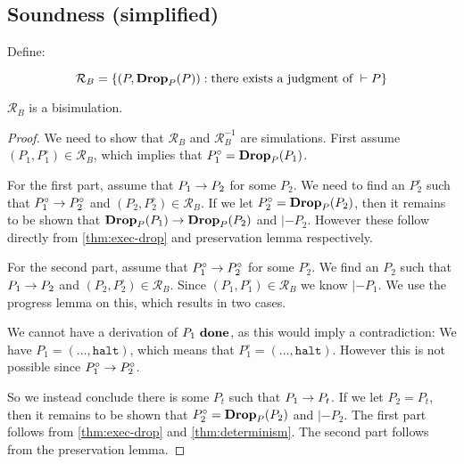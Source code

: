 \subsection{Soundness (simplified)}
\begin{lemma}[Bisimulation]
  \label{thm:bisimulation}
  Define:

  $$\mathcal{R}_B =\{(P, \mathbf{Drop}_{{P}}({P})) : \text{there exists a judgment of } |-
  P\}$$

  $\mathcal{R}_B$ is a bisimulation.
\end{lemma}
\begin{proof}
  We need to show that $\mathcal{R}_B$ and $\mathcal{R}_B^{-1}$ are
  simulations. First assume $(P_1, P^\circ_1) \in \mathcal{R}_B$, which implies
  that $P^\circ_1 = \mathbf{Drop}_{{P}}({P_1})$.

  For the first part, assume that ${P_1} -> {P_2}$ for some $P_2$. We need to
  find an $P^\circ_2$ such that ${P^\circ_1} -> {P^\circ_2}$ and
  $(P_2, P^\circ_2) \in \mathcal{R}_B$. If we let $P^\circ_2 = \mathbf{Drop}_{{P}}({P_2})$,
  then it remains to be shown that ${\mathbf{Drop}_{{P}}({P_1})} -> {\mathbf{Drop}_{{P}}({P_2})}$ and
  $|- P_2$. However these follow directly from \autoref{thm:exec-drop} and
  preservation lemma respectively.

  For the second part, assume that ${P^\circ_1} -> {P^\circ_2}$ for some
  $P^\circ_2$. We find an $P_2$ such that ${P_1} -> {P_2}$ and
  $(P_2, P^\circ_2) \in \mathcal{R}_B$. Since
  $(P_1, P^\circ_1) \in \mathcal{R}_B$ we know $|- P_1$. We use the progress
  lemma on this, which results in two cases.

  We cannot have a derivation of ${P_1}\ \mathbf{done}$, as this would imply a
  contradiction: We have $P_1 = (\dots, \mathtt{halt})$, which means that
  $P^\circ_1 = (\dots, \mathtt{halt})$. However this is not possible since
  ${P^\circ_1} -> {P^\circ_2}$.

  So we instead conclude there is some $P_t$ such that ${P_1} -> {P_t}$. If we let
  $P_2 = P_t$, then it remains to be shown that $P^\circ_2 = \mathbf{Drop}_{{P}}({P_2})$ and
  $|- P_2$. The first part follows from \autoref{thm:exec-drop} and
  \autoref{thm:determinism}. The second part follows from the preservation
  lemma.
\end{proof}

